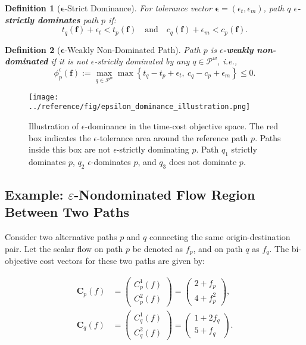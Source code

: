 \documentclass[11pt]{article}
\newtheorem{definition}{Definition}[section]
\begin{document}
\begin{definition}[$\boldsymbol{\epsilon}$-Strict Dominance]
For tolerance vector $\boldsymbol{\epsilon} = (\epsilon_t, \epsilon_m)$, path $q$ \textbf{$\epsilon$-strictly dominates} path $p$ if:
\[
t_q(\mathbf{f}) + \epsilon_t < t_p(\mathbf{f}) \quad \text{and} \quad c_q(\mathbf{f}) + \epsilon_m < c_p(\mathbf{f}).
\]
\end{definition}

\begin{definition}[$\boldsymbol{\epsilon}$-Weakly Non-Dominated Path]
Path $p$ is \textbf{$\epsilon$-weakly non-dominated} if it is not $\epsilon$-strictly dominated by any $q \in \mathcal{P}^w$, i.e.,
\[
\phi_p^{\epsilon}(\mathbf{f}) := \max_{q \in \mathcal{P}^w} \max \left\{ t_q - t_p + \epsilon_t,\ c_q - c_p + \epsilon_m \right\} \le 0.
\]
\end{definition}

\begin{figure}[ht]
    \centering
    \texttt{[image: ../reference/fig/epsilon\_dominance\_illustration.png]}
    \caption{Illustration of $\epsilon$-dominance in the time-cost objective space. The red box indicates the $\epsilon$-tolerance area around the reference path $p$. Paths inside this box are not $\epsilon$-strictly dominating $p$. Path $q_1$ strictly dominates $p$, $q_2$ $\epsilon$-dominates $p$, and $q_3$ does not dominate $p$.}
\end{figure}

\subsection*{Example: $\varepsilon$-Nondominated Flow Region Between Two Paths}

Consider two alternative paths \( p \) and \( q \) connecting the same origin-destination pair. Let the scalar flow on path \( p \) be denoted as \( f_p \), and on path \( q \) as \( f_q \). The bi-objective cost vectors for these two paths are given by:

\[
\begin{aligned}
\mathbf{C}_p(f) &= 
\begin{pmatrix}
C_p^1(f) \\
C_p^2(f)
\end{pmatrix}
= 
\begin{pmatrix}
2 + f_p \\
4 + f_p^2
\end{pmatrix}, \\
\mathbf{C}_q(f) &= 
\begin{pmatrix}
C_q^1(f) \\
C_q^2(f)
\end{pmatrix}
= 
\begin{pmatrix}
1 + 2f_q \\
5 + f_q
\end{pmatrix}.
\end{aligned}
\]
\end{document}
